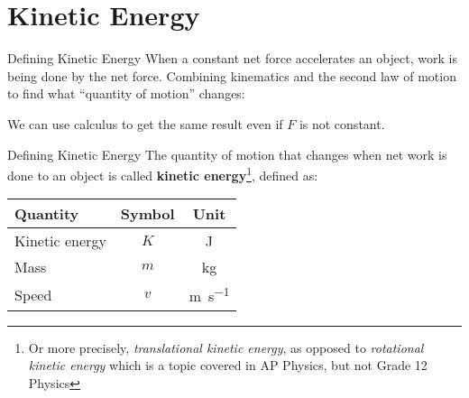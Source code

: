 \documentclass[12pt,compress,aspectratio=169]{beamer}
\begin{document}
\section{Kinetic Energy}

\begin{frame}{Defining Kinetic Energy}
  When a constant net force accelerates an object, work is being done by the
  net force. Combining kinematics and the second law of motion to find what
  ``quantity of motion'' changes:

  
  We can use calculus to get the same result even if $F$ is not constant.
\end{frame}


\begin{frame}{Defining Kinetic Energy}
  The quantity of motion that changes when net work is done to an object is
  called \textbf{kinetic energy}\footnote{Or more precisely, \emph{translational
  kinetic energy}, as opposed to \emph{rotational kinetic energy} which is a
  topic covered in AP Physics, but not Grade 12 Physics}, defined as:
  
  \begin{center}
    \begin{tabular}{l|c|c}
      \rowcolor{pink}
      \textbf{Quantity} & \textbf{Symbol} & \textbf{Unit} \\ \hline
      Kinetic energy & $K$ & \si\joule \\
      Mass           & $m$ & \si{\kilo\gram} \\
      Speed          & $v$ & \si{\metre\per\second}
    \end{tabular}
  \end{center}
\end{frame}
\end{document}
